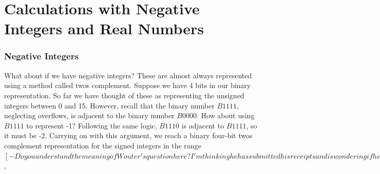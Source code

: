\documentclass[../physical_computing.tex]{subfiles}
\begin{document}
\chapter{Calculations with Negative Integers and Real Numbers}
\label{ch:arithmetic}

\subsection{Negative Integers}
\label{sec:negatives}

What about if we have negative integers? These are almost always represented using a method called twos complement. Suppose we have 4 bits in our binary representation. So far we have thought of these as representing the unsigned integers between 0 and 15. However, recall that the binary number $B1111$, neglecting overflows, is adjacent to the binary number $B0000$. How about using $B1111$ to represent -1? Following the same logic, $B1110$ is adjacent to $B1111$, so it must be -2. Carrying on with this argument, we reach a binary four-bit twos complement representation for the signed integers in the range $[-Do you understand the meaning of Wouter's question here? I'm thinking he has submitted his receipts and is wondering if he has to do anything else to get reimbursed, and probably how long it is likely to take? I'm asking because we are of course trying to hire this guy, soDo you understand the meaning of Wouter's question here? I'm thinking he has submitted his receipts and is wondering if he has to do anything else to get reimbursed, and probably how long it is likely to take? I'm asking because we are of course trying to hire this guy, so8,+7]$,
\end{document}
